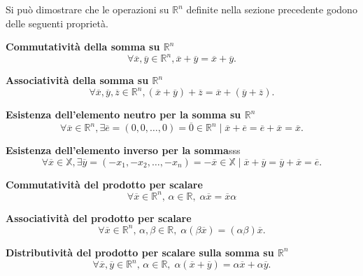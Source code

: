 Si può dimostrare che le operazioni su $\mathbb{R}^n$ definite nella sezione precedente godono
delle seguenti proprietà.

\begin{property}
    \textbf{Commutatività della somma su $\mathbb{R}^n$}
    \[ \forall\overline{x},\overline{y}\in\mathbb{R}^n,
    \overline{x}+\overline{y}=\overline{x}+\overline{y}. \]
\end{property}
\begin{property}
    \textbf{Associatività della somma su $\mathbb{R}^n$}
    \[ \forall\overline{x},\overline{y},\overline{z}\in\mathbb{R}^n,
    \left(\overline{x}+\overline{y}\right)+\overline{z}=
    \overline{x}+\left(\overline{y}+\overline{z}\right). \]
\end{property}
\begin{property}
    \textbf{Esistenza dell'elemento neutro per la somma su $\mathbb{R}^n$}
    \[ \forall \overline{x}\in\mathbb{R}^n,  \exists\overline{e}=\left(0, 0,
    \ldots, 0\right)=\overline{0}\in\mathbb{R}^n \mid \overline{x}+\overline{e}
    =\overline{e}+\overline{x}=\overline{x}.\]
\end{property}
\begin{property}
    \textbf{Esistenza dell'elemento inverso per la somma}sss
    \[ \forall \overline{x}\in\mathbb{X},  \exists\overline{y}=\left(-x_1, -x_2,
    \ldots, -x_n\right)=-\overline{x}\in\mathbb{X} \mid \overline{x}+\overline{y}
    =\overline{y}+\overline{x}=\overline{e}.\]
\end{property}


\begin{property}
    \textbf{Commutatività del prodotto per scalare}
    \[ \forall\overline{x}\in\mathbb{R}^n, \,\alpha\in\mathbb{R},\;
    \alpha \overline{x} = \overline{x} \alpha \]
\end{property}
\begin{property}
    \textbf{Associatività del prodotto per scalare}
    \[ \forall\overline{x}\in\mathbb{R}^n,\, \alpha,\beta\in\mathbb{R},\;
    \alpha\left(\beta \overline{x}\right) = \left(\alpha\beta\right)\overline{x}. \]
\end{property}
\begin{property}
    \textbf{Distributività del prodotto per scalare sulla somma su $\mathbb{R}^n$}
    \[ \forall\overline{x},\overline{y}\in\mathbb{R}^n,\, \alpha\in\mathbb{R},\;
    \alpha\left(\overline{x}+\overline{y}\right) = \alpha\overline{x}+\alpha\overline{y}. \]
\end{property}


